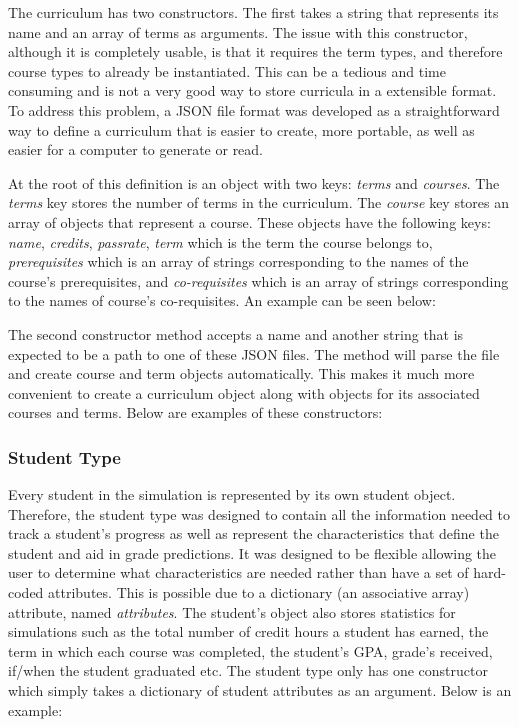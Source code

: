 \documentclass[botnum, fleqn]{unmeethesis}
\begin{document}
        The curriculum has two constructors. The first takes a string that represents its name and an array of terms as arguments. The issue with this constructor, although it is completely usable, is that it requires the term types, and therefore course types to already be instantiated. This can be a tedious and time consuming and is not a very good way to store curricula in a extensible format. To address this problem, a JSON file format was developed as a straightforward way to define a curriculum that is easier to create, more portable, as well as easier for a computer to generate or read.

        At the root of this definition is an object with two keys: \textit{terms} and \textit{courses}. The \textit{terms} key stores the number of terms in the curriculum. The \textit{course} key stores an array of objects that represent a course. These objects have the following keys: \textit{name}, \textit{credits}, \textit{passrate}, \textit{term} which is the term the course belongs to, \textit{prerequisites} which is an array of strings corresponding to the names of the course's prerequisites, and \textit{co-requisites} which is an array of strings corresponding to the names of course's co-requisites. An example can be seen below:

        

        The second constructor method accepts a name and another string that is expected to be a path to one of these JSON files. The method will parse the file and create course and term objects automatically. This makes it much more convenient to create a curriculum object along with objects for its associated courses and terms. Below are examples of these constructors:

        

      \subsubsection{Student Type}
        Every student in the simulation is represented by its own student object. Therefore, the student type was designed to contain all the information needed to track a student's progress as well as represent the characteristics that define the student and aid in grade predictions. It was designed to be flexible allowing the user to determine what characteristics are needed rather than have a set of hard-coded attributes. This is possible due to a dictionary (an associative array) attribute, named \textit{attributes}. The student's object also stores statistics for simulations such as the total number of credit hours a student has earned, the term in which each course was completed, the student's GPA, grade's received, if/when the student graduated etc. The student type only has one constructor which simply takes a dictionary of student attributes as an argument. Below is an example:
\end{document}
